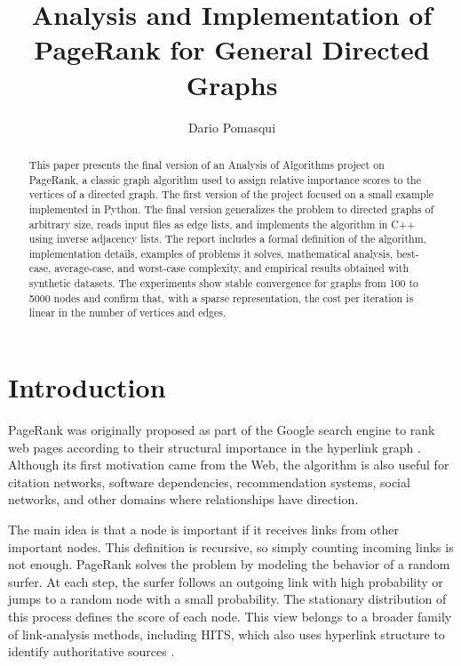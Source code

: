 \documentclass[runningheads]{llncs}
\begin{document}
%
\title{Analysis and Implementation of PageRank for General Directed Graphs}
%
%

\author{Dario Pomasqui}
%
%
%
\maketitle              %
%
\begin{abstract}
This paper presents the final version of an Analysis of Algorithms project on PageRank, a classic graph algorithm used to assign relative importance scores to the vertices of a directed graph. The first version of the project focused on a small example implemented in Python. The final version generalizes the problem to directed graphs of arbitrary size, reads input files as edge lists, and implements the algorithm in C++ using inverse adjacency lists. The report includes a formal definition of the algorithm, implementation details, examples of problems it solves, mathematical analysis, best-case, average-case, and worst-case complexity, and empirical results obtained with synthetic datasets. The experiments show stable convergence for graphs from 100 to 5000 nodes and confirm that, with a sparse representation, the cost per iteration is linear in the number of vertices and edges.

\end{abstract}
%
%
%
\section{Introduction}

PageRank was originally proposed as part of the Google search engine to rank web pages according to their structural importance in the hyperlink graph \cite{brin1998anatomy,page1999pagerank}. Although its first motivation came from the Web, the algorithm is also useful for citation networks, software dependencies, recommendation systems, social networks, and other domains where relationships have direction.

The main idea is that a node is important if it receives links from other important nodes. This definition is recursive, so simply counting incoming links is not enough. PageRank solves the problem by modeling the behavior of a random surfer. At each step, the surfer follows an outgoing link with high probability or jumps to a random node with a small probability. The stationary distribution of this process defines the score of each node. This view belongs to a broader family of link-analysis methods, including HITS, which also uses hyperlink structure to identify authoritative sources \cite{kleinberg1999authoritative}.
\end{document}
